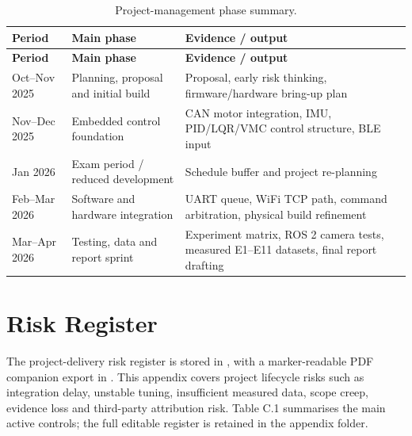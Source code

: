 \documentclass[12pt, a4paper]{article}
\begin{document}
\begingroup
\singlespacing
\small
\setlength{\tabcolsep}{2pt}
\renewcommand{\arraystretch}{1.15}
\begin{longtable}{>{\RaggedRight\arraybackslash}p{}>{\RaggedRight\arraybackslash}p{}>{\RaggedRight\arraybackslash}p{}}
\caption{Project-management phase summary.}\\
\toprule
\textbf{Period} & \textbf{Main phase} & \textbf{Evidence / output} \\
\midrule
\endfirsthead
\toprule
\textbf{Period} & \textbf{Main phase} & \textbf{Evidence / output} \\
\midrule
\endhead
Oct--Nov 2025 & Planning, proposal and initial build & Proposal, early risk thinking, firmware/hardware bring-up plan \\
Nov--Dec 2025 & Embedded control foundation & CAN motor integration, IMU, PID/LQR/VMC control structure, BLE input \\
Jan 2026 & Exam period / reduced development & Schedule buffer and project re-planning \\
Feb--Mar 2026 & Software and hardware integration & UART queue, WiFi TCP path, command arbitration, physical build refinement \\
Mar--Apr 2026 & Testing, data and report sprint & Experiment matrix, ROS 2 camera tests, measured E1--E11 datasets, final report drafting \\
\bottomrule
\end{longtable}
\endgroup

\section{Risk Register}
The project-delivery risk register is stored in , with a marker-readable PDF companion export in . This appendix covers project lifecycle risks such as integration delay, unstable tuning, insufficient measured data, scope creep, evidence loss and third-party attribution risk. Table C.1 summarises the main active controls; the full editable register is retained in the appendix folder.
\end{document}
